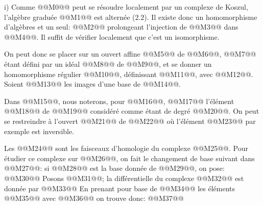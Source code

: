 
i)
Comme @@M0@@ peut se résoudre localement par un complexe de Koszul, l'algèbre graduée @@M1@@ est alternée (2.2). Il existe donc un homomorphisme d'algèbres et un seul:
@@M2@@
prolongeant l'injection de @@M3@@ dans
@@M4@@. Il suffit de vérifier localement que c'est un isomorphisme.

On peut donc se placer sur un ouvert affine @@M5@@ de @@M6@@, @@M7@@ étant défini par un idéal @@M8@@ de @@M9@@, et se donner un homomorphisme régulier @@M10@@, définissant @@M11@@, avec @@M12@@. Soient @@M13@@ les images d'une base de @@M14@@.

Dans @@M15@@, nous noterons, pour @@M16@@, @@M17@@ l'élément @@M18@@ de @@M19@@ considéré comme étant de degré @@M20@@. On peut se restreindre à l'ouvert @@M21@@ de @@M22@@ où l'élément @@M23@@ par exemple est inversible.

Les @@M24@@ sont les faisceaux d'homologie du complexe @@M25@@. Pour étudier ce complexe sur @@M26@@, on fait le changement de base suivant dans @@M27@@: si @@M28@@ est la base donnée de @@M29@@, on pose:
@@M30@@
Posons @@M31@@; la différentielle du complexe @@M32@@ est donnée par
@@M33@@
En prenant pour base de @@M34@@ les éléments
@@M35@@ avec @@M36@@ on trouve donc:
@@M37@@

